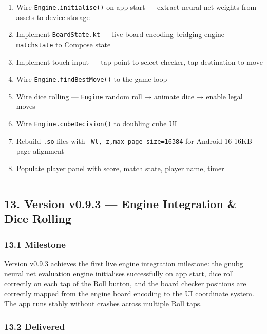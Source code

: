 \documentclass[11pt,a4paper]{article}
\providecommand{\tightlist}{\setlength{\itemsep}{2pt}\setlength{\parskip}{0pt}}
\begin{document}
\begin{enumerate}
\def\labelenumi{\arabic{enumi}.}
\tightlist
\item
  Wire \texttt{Engine.initialise()} on app start --- extract neural net
  weights from assets to device storage
\item
  Implement \texttt{BoardState.kt} --- live board encoding bridging
  engine \texttt{matchstate} to Compose state
\item
  Implement touch input --- tap point to select checker, tap
  destination to move
\item
  Wire \texttt{Engine.findBestMove()} to the game loop
\item
  Wire dice rolling --- \texttt{Engine} random roll → animate dice →
  enable legal moves
\item
  Wire \texttt{Engine.cubeDecision()} to doubling cube UI
\item
  Rebuild \texttt{.so} files with \texttt{-Wl,-z,max-page-size=16384}
  for Android 16 16KB page alignment
\item
  Populate player panel with score, match state, player name, timer
\end{enumerate}

\begin{center}\rule{0.5\linewidth}{0.5pt}\end{center}

\subsection{13. Version v0.9.3 --- Engine Integration \& Dice
Rolling}\label{version-v093-engine-integration}

\subsubsection{13.1 Milestone}\label{milestone-v093}

Version v0.9.3 achieves the first live engine integration milestone: the
gnubg neural net evaluation engine initialises successfully on app
start, dice roll correctly on each tap of the Roll button, and the
board checker positions are correctly mapped from the engine board
encoding to the UI coordinate system. The app runs stably without
crashes across multiple Roll taps.

\subsubsection{13.2 Delivered}\label{delivered-v093}
\end{document}
